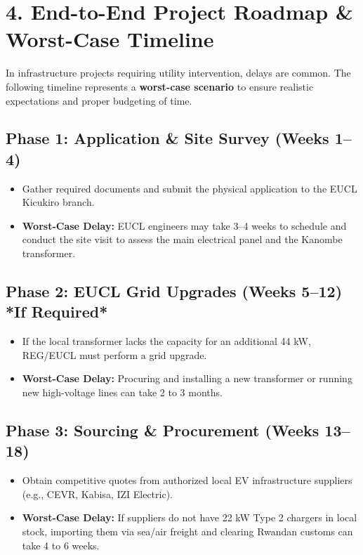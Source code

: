\documentclass[11pt,a4paper]{article}
\begin{document}
\vspace{1em}
\noindent{}
\vspace{1em}

\section{4. End-to-End Project Roadmap \& Worst-Case Timeline}
In infrastructure projects requiring utility intervention, delays are common. The following timeline represents a \textbf{worst-case scenario} to ensure realistic expectations and proper budgeting of time.

\subsection{Phase 1: Application \& Site Survey (Weeks 1--4)}
\begin{itemize}
    \item Gather required documents and submit the physical application to the EUCL Kicukiro branch.
    \item \textbf{Worst-Case Delay:} EUCL engineers may take 3--4 weeks to schedule and conduct the site visit to assess the main electrical panel and the Kanombe transformer.
\end{itemize}

\subsection{Phase 2: EUCL Grid Upgrades (Weeks 5--12) *If Required*}
\begin{itemize}
    \item If the local transformer lacks the capacity for an additional 44 kW, REG/EUCL must perform a grid upgrade.
    \item \textbf{Worst-Case Delay:} Procuring and installing a new transformer or running new high-voltage lines can take 2 to 3 months.
\end{itemize}

\subsection{Phase 3: Sourcing \& Procurement (Weeks 13--18)}
\begin{itemize}
    \item Obtain competitive quotes from authorized local EV infrastructure suppliers (e.g., CEVR, Kabisa, IZI Electric).
    \item \textbf{Worst-Case Delay:} If suppliers do not have 22 kW Type 2 chargers in local stock, importing them via sea/air freight and clearing Rwandan customs can take 4 to 6 weeks.
\end{itemize}
\end{document}
